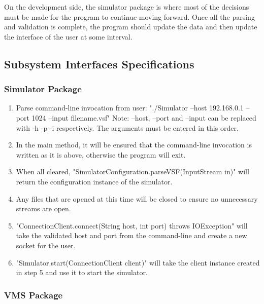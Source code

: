 \documentclass{article}
\begin{document}
On the development side, the simulator package is where most of the decisions must be made for the program to continue moving forward. Once all the parsing and validation is complete, the program should update the data and then update the interface of the user at some interval.

\break

\subsection{Subsystem Interfaces Specifications} %

\subsubsection{Simulator Package} %

\begin{enumerate}
  \item Parse command-line invocation from user: 
		\newline "./Simulator --host 192.168.0.1 --port 1024 --input filename.vsf"
		\newline Note: --host, --port and --input can be replaced with -h -p -i respectively.
		\newline The arguments must be entered in this order.
  \item In the main method, it will be ensured that the command-line invocation is written as it is above, otherwise the program will exit.
  \item When all cleared, "SimulatorConfiguration.parseVSF(InputStream in)" will return the configuration instance of the simulator.
  \item Any files that are opened at this time will be closed to ensure no unnecessary streams are open.
	\item "ConnectionClient.connect(String host, int port) throws IOException" will take the validated host and port from the command-line and create a new socket for the user.
	\item "Simulator.start(ConnectionClient client)" will take the client instance created in step 5 and use it to start the simulator.	
\end{enumerate}

\subsubsection{VMS Package} %
\end{document}
